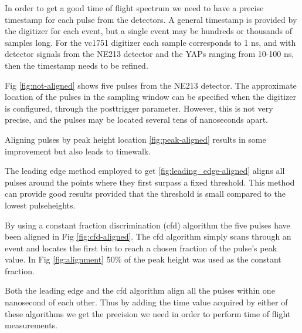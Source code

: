 \documentclass[main.tex]{subfiles}
\begin{document}
In order to get a good time of flight spectrum we need to have a precise timestamp for each pulse from the detectors. A general timestamp is provided by the digitizer for each event, but a single event may be hundreds or thousands of samples long. For the vc1751 digitizer each sample corresponds to 1 ns, and with detector signals from the NE213 detector and the YAPs ranging from 10-100 ns, then the timestamp needs to be refined.

Fig \ref{fig:not-aligned} shows five pulses from the NE213 detector. The approximate location of the pulses in the sampling window can be specified when the digitizer is configured, through the posttrigger parameter. However, this is not very precise, and the pulses may be located several tens of nanoseconds apart. 

Aligning pulses by peak height location \ref{fig:peak-aligned} results in some improvement but also leads to timewalk.

The leading edge method employed to get \ref{fig:leading_edge-aligned} aligns all pulses around the points where they first surpass a fixed threshold. This method can provide good results provided that the threshold is small compared to the lowest pulseheights. 

By using a constant fraction discrimination (cfd) algorithm the five pulses have been aligned in Fig \ref{fig:cfd-aligned}. The cfd algorithm simply scans through an event and locates the first bin to reach a chosen fraction of the pulse's peak value. In Fig \ref{fig:alignment} 50\% of the peak height was used as the constant fraction. 

Both the leading edge and the cfd algorithm align all the pulses within one nanosecond of each other. Thus by adding the time value acquired by either of these algorithms we get the precision we need in order to perform time of flight measurements.
\end{document}
